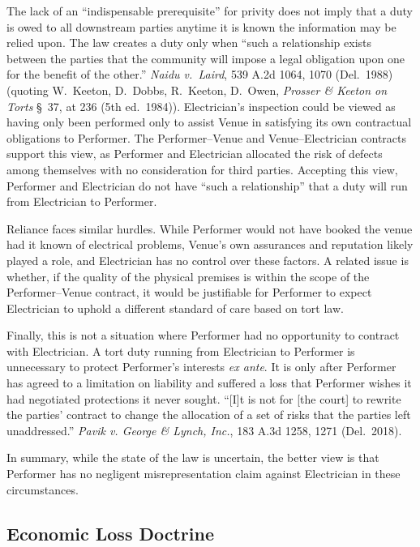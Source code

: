 \documentclass[
  12pt,
  letterpaper,
]{scrartcl}
\begin{document}
The lack of an ``indispensable prerequisite'' for privity does not imply
that a duty is owed to all downstream parties anytime it is known the
information may be relied upon. The law creates a duty only when ``such
a relationship exists between the parties that the community will impose
a legal obligation upon one for the benefit of the other.'' \emph{Naidu
v.~Laird}, 539 A.2d 1064, 1070 (Del.~1988) (quoting W.~Keeton, D.~Dobbs,
R.~Keeton, D.~Owen, \emph{Prosser \& Keeton on Torts} §~37, at 236 (5th
ed.~1984)). Electrician's inspection could be viewed as having only been
performed only to assist Venue in satisfying its own contractual
obligations to Performer. The Performer--Venue and Venue--Electrician
contracts support this view, as Performer and Electrician allocated the
risk of defects among themselves with no consideration for third
parties. Accepting this view, Performer and Electrician do not have
``such a relationship'' that a duty will run from Electrician to
Performer.

Reliance faces similar hurdles. While Performer would not have booked
the venue had it known of electrical problems, Venue's own assurances
and reputation likely played a role, and Electrician has no control over
these factors. A related issue is whether, if the quality of the
physical premises is within the scope of the Performer--Venue contract,
it would be justifiable for Performer to expect Electrician to uphold a
different standard of care based on tort law.

Finally, this is not a situation where Performer had no opportunity to
contract with Electrician. A tort duty running from Electrician to
Performer is unnecessary to protect Performer's interests \emph{ex
ante}. It is only after Performer has agreed to a
limitation on liability and suffered a loss that Performer wishes it
had negotiated protections it never sought. ``{[}I{]}t is not for {[}the
court{]} to rewrite the parties' contract to change the allocation of a
set of risks that the parties left unaddressed.'' \emph{Pavik v. George
\& Lynch, Inc.}, 183 A.3d 1258, 1271 (Del.~2018).

In summary, while the state of the law is uncertain, the better view is
that Performer has no negligent misrepresentation claim against
Electrician in these circumstances.

\hypertarget{economic-loss-doctrine}{%
\subsection{Economic Loss Doctrine}\label{economic-loss-doctrine}}
\end{document}
